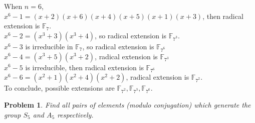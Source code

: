 \documentclass[12pt]{article}
\newtheorem{problem}{Problem}
\begin{document}
\indent When $n=6$, \\
\indent\indent $x^6-1=(x+2)(x+6)(x+4)(x+5)(x+1)(x+3)$, then radical extension is $\mathbb{F}_{7}$. \\
\indent\indent $x^6-2=(x^3+3)(x^3+4)$, so radical extension is $\mathbb{F}_{7^3}$. \\
\indent\indent $x^6-3$ is irreducible in $\mathbb{F}_{7}$, so radical extension is $\mathbb{F}_{7^6}$ \\
\indent\indent $x^6-4=(x^3+5)(x^3+2)$, radical extension is $\mathbb{F}_{7^3}$ \\
\indent\indent $x^6-5$ is irreducible, then radical extension is $\mathbb{F}_{7^6}$ \\
\indent\indent $x^6-6=(x^2+1)(x^2+4)(x^2+2)$, radical extension is $\mathbb{F}_{7^2}$. \\
\indent To conclude, possible extensions are $\mathbb{F}_{7^2}, \mathbb{F}_{7^3}, \mathbb{F}_{7^6}$.

\begin{problem}
Find all pairs of elements (modulo conjugation) which generate the group $S_{5}$ and $A_{5}$ respectively.
\end{problem}
\end{document}
